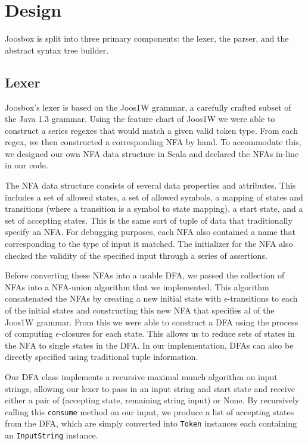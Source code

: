 \documentclass[letterpaper]{article}
\begin{document}
  \section{Design}

  Joosbox is split into three primary components: the lexer, the parser, and the
  abstract syntax tree builder.

  \subsection{Lexer}

  Joosbox's lexer is based on the Joos1W grammar, a carefully crafted subset of
  the Java 1.3 grammar. Using the feature chart of Joos1W we were able to
  construct a series regexes that would match a given valid token type. From
  each regex, we then constructed a corresponding NFA by hand. To accommodate
  this, we designed our own NFA data structure in Scala and declared the NFAs
  in-line in our code.

  The NFA data structure consists of several data properties and attributes.
  This includes a set of allowed states, a set of allowed symbols, a mapping
  of states and transitions (where a transition is a symbol to state mapping),
  a start state, and a set of accepting states. This is the same sort of tuple
  of data that traditionally specify an NFA. For debugging purposes, each NFA
  also contained a name that corresponding to the type of input it matched. The
  initializer for the NFA also checked the validity of the specified input
  through a series of assertions.

  Before converting these NFAs into a usable DFA, we passed the collection of
  NFAs into a NFA-union algorithm that we implemented. This algorithm
  concatenated the NFAs by creating a new initial state with
  $\epsilon$-transitions to each of the initial states and constructing this
  new NFA that specifies al of the Joos1W grammar. From this we were able to
  construct a DFA using the process of computing $\epsilon$-closures for each
  state. This allows us to reduce sets of states in the NFA to single states in
  the DFA. In our implementation, DFAs can also be directly specified using
  traditional tuple information.

  Our DFA class implements a recursive maximal munch algorithm on input
  strings, allowing our lexer to pass in an input string and start state and
  receive either a pair of (accepting state, remaining string input) or None.
  By recursively calling this {\tt consume} method on our input, we produce
  a list of accepting states from the DFA, which are simply converted into
  {\tt Token} instances each containing an {\tt InputString} instance.
\end{document}
